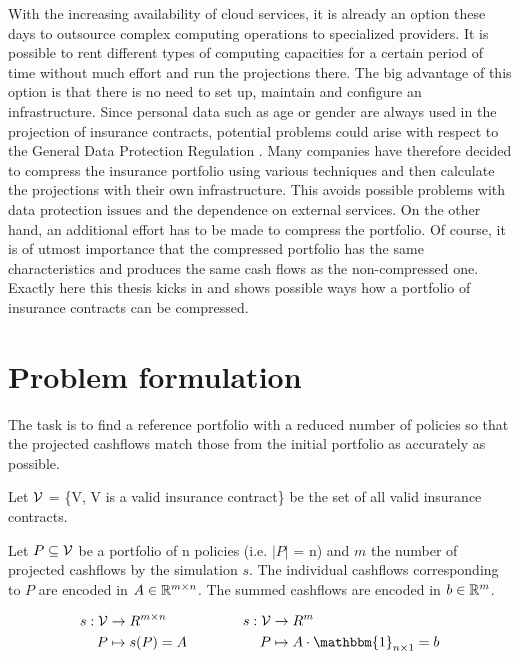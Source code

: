 With the increasing availability of cloud services, it is already an option these days to outsource complex computing operations to specialized providers. It is possible to rent different types of computing capacities for a certain period of time without much effort and run the projections there. The big advantage of this option is that there is no need to set up, maintain and configure an infrastructure. Since personal data such as age or gender are always used in the projection of insurance contracts, potential problems could arise with respect to the General Data Protection Regulation \cite{datenschutz}. Many companies have therefore decided to compress the insurance portfolio using various techniques and then calculate the projections with their own infrastructure. This avoids possible problems with data protection issues and the dependence on external services. On the other hand, an additional effort has to be made to compress the portfolio.
Of course, it is of utmost importance that the compressed portfolio has the same characteristics and produces the same cash flows as the non-compressed one. Exactly here this thesis kicks in and shows possible ways how a portfolio of insurance contracts can be compressed. 

\section{Problem formulation}
The task is to find a reference portfolio with a reduced number of policies so that the projected cashflows match those from the initial portfolio as accurately as possible. 

\begin{definition}
	Let $\mathcal{V}$ = \{V, V is a valid insurance contract\} be the set of all valid insurance contracts. 
\end{definition}

\begin{definition}
	Let $P \subseteq \mathcal{V}$ be a portfolio of n policies (i.e. $\vert P \vert$ = n) and $m$ the number of projected cashflows by the simulation $s$. The individual cashflows corresponding to $P$ are encoded in $A \in \mathbb{R}^{m \times n}$. The summed cashflows are encoded in $b \in \mathbb{R}^m$.

	\begin{equation*}
	\begin{aligned}[c]
	s: \V &\rightarrow R^{m \times n}\\
		P & \mapsto s(P)=A\\
	\end{aligned}
	\qquad \qquad
	\begin{aligned}[c]
	s: \V &\rightarrow R^m\\
		P & \mapsto A \cdot \mathbbm{1}_{n \times 1} = b \\
	\end{aligned}
	\end{equation*}
	
\end{definition}

